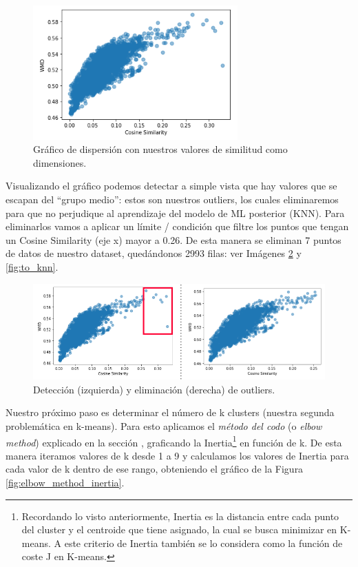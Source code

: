 \documentclass[12pt,a4paper]{article}
\begin{document}
\begin{sloppypar}
\begin{figure}[H]   
\centering
\includegraphics[width=0.7\textwidth]{images/implementacion_5/dispersion.png}
\captionsetup{justification=centering,margin=2cm}
\caption{Gráfico de dispersión con nuestros valores de similitud como dimensiones.}
\label{fig:dispersion}
\end{figure}

Visualizando el gráfico podemos detectar a simple vista que hay valores que se escapan del “grupo medio”: estos son nuestros outliers, los cuales eliminaremos para que no perjudique al aprendizaje del modelo de ML posterior (KNN). Para eliminarlos vamos a aplicar un límite / condición que filtre los puntos que tengan un Cosine Similarity (eje x) mayor a 0.26. De esta manera se eliminan 7 puntos de datos de nuestro dataset, quedándonos 2993 filas: ver Imágenes \ref{fig:detec_elim_outliers} y \ref{fig:to_knn}.

\begin{figure}[H]   
\centering
\includegraphics[width=1\textwidth]{images/implementacion_5/detec_elim_outliers.png}
\caption{Detección (izquierda) y eliminación (derecha) de outliers.}
\label{fig:detec_elim_outliers}
\end{figure}

Nuestro próximo paso es determinar el número de k clusters (nuestra segunda problemática en k-means). Para esto aplicamos el \textit{método del codo} (o \textit{elbow method}) explicado en la sección \textit{}, graficando la Inertia\footnote{Recordando lo visto anteriormente, Inertia es la distancia entre cada punto del cluster y el centroide que tiene asignado, la cual se busca minimizar en K-means. A este criterio de Inertia también se lo considera como la función de coste J en K-means.} en función de k. De esta manera iteramos valores de k desde 1 a 9 y calculamos los valores de Inertia para cada valor de k dentro de ese rango, obteniendo el gráfico de la Figura \ref{fig:elbow_method_inertia}.


\end{sloppypar}
\end{document}
